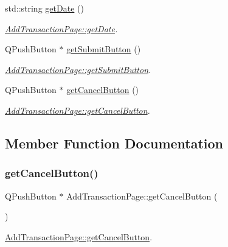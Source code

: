 \begin{DoxyCompactItemize}
std\+::string \mbox{\hyperlink{class_add_transaction_page_a7c6a8d3a13aebb698413b08e28baf1ab}{get\+Date}} ()
\begin{DoxyCompactList}\small\item\em \mbox{\hyperlink{class_add_transaction_page_a7c6a8d3a13aebb698413b08e28baf1ab}{Add\+Transaction\+Page\+::get\+Date}}. \end{DoxyCompactList}\item 
Q\+Push\+Button $\ast$ \mbox{\hyperlink{class_add_transaction_page_a6133a9ed435119693730f49e409ab748}{get\+Submit\+Button}} ()
\begin{DoxyCompactList}\small\item\em \mbox{\hyperlink{class_add_transaction_page_a6133a9ed435119693730f49e409ab748}{Add\+Transaction\+Page\+::get\+Submit\+Button}}. \end{DoxyCompactList}\item 
Q\+Push\+Button $\ast$ \mbox{\hyperlink{class_add_transaction_page_a902254b4280142c7d4ab1fe2ea54e92d}{get\+Cancel\+Button}} ()
\begin{DoxyCompactList}\small\item\em \mbox{\hyperlink{class_add_transaction_page_a902254b4280142c7d4ab1fe2ea54e92d}{Add\+Transaction\+Page\+::get\+Cancel\+Button}}. \end{DoxyCompactList}\end{DoxyCompactItemize}


\subsection{Member Function Documentation}
\mbox{\label{class_add_transaction_page_a902254b4280142c7d4ab1fe2ea54e92d}} 
\subsubsection{\texorpdfstring{get\+Cancel\+Button()}{getCancelButton()}}
{\footnotesize\ttfamily Q\+Push\+Button $\ast$ Add\+Transaction\+Page\+::get\+Cancel\+Button (\begin{DoxyParamCaption}{ }\end{DoxyParamCaption})}



\mbox{\hyperlink{class_add_transaction_page_a902254b4280142c7d4ab1fe2ea54e92d}{Add\+Transaction\+Page\+::get\+Cancel\+Button}}. 

